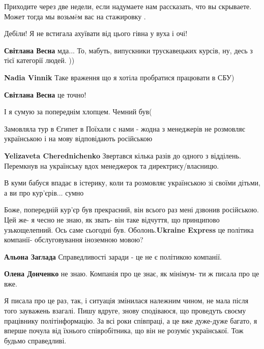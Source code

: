 \begin{itemize}
\begin{itemize}
Приходите через две недели, если надумаете нам рассказать, что вы скрываете. Может тогда мы возьмëм вас на стажировку .

Дебіли! Я не встигала ахуївати від цього гівна у вуха і очі!


\textbf{Світлана Весна} мда... То, мабуть, випускники трускавецьких курсів, ну, десь з тієї категорії людей. ))

\textbf{Nadia Vinnik} Таке враження що я хотіла пробратися працювати в СБУ)

\textbf{Світлана Весна} це точно!

\end{itemize} %

І я сумую за попереднім хлопцем. Чемний був(

Замовляла тур в Єгипет в Поїхали с нами - жодна з менеджерів не розмовляє українською і на мову відповідають російською

\begin{itemize} %
\textbf{Yelizaveta Cherednichenko}
Звертався кілька разів до одного з відділень.
Перемкнув на українську вдох менеджерок та директрису/власницю.
\end{itemize} %

В куми бабуся впадає в істерику, коли та розмовляє українською зі своїми дітьми, а ви про кур'єрів... сумно


Боже, попередній кур'єр був прекрасний, він всього раз мені дзвонив російською.
Цей же- я чесно не знаю, як звать- він таке відчуття, що принципово
узькощелепний. Ось саме сьогодні був. Оболонь.\textbf{Ukraine Express} це політика
компанії- обслуговування іноземною мовою?

\begin{itemize} %
\textbf{Альона Заглада} Справедливості заради - це не є політикою компанії.

\textbf{Олена Донченко} не знаю. Компанія про це знає, як мінімум- ти ж писала про це вже.


Я писала про це раз, так, і ситуація змінилася належним чином, не мала після
того зауважень взагалі. Пишу вдруге, знову сподіваюся, що проведуть своєму
працівнику політінформацію. За всі роки співпраці, а це вже дуже-дуже багато, я
вперше почула від їхнього співробітника, що він не розуміє української. Тож
будьмо справедливі.

\end{itemize} %

\end{itemize} %
